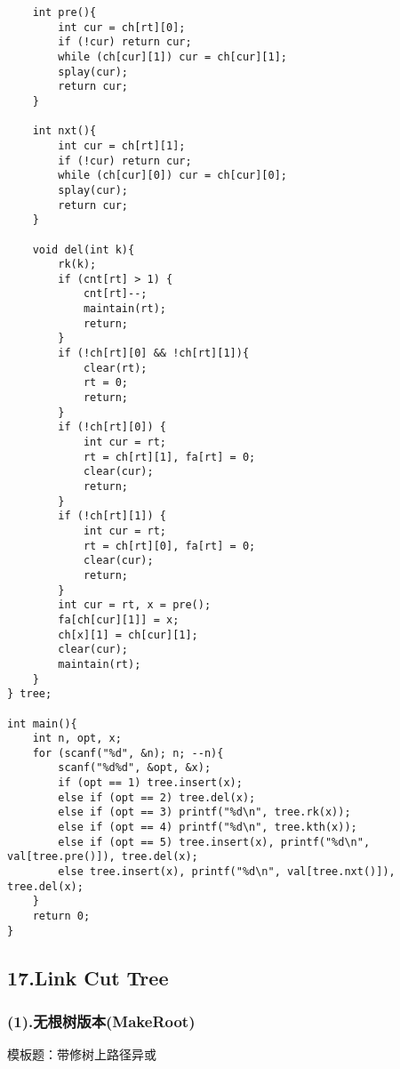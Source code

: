 \documentclass[]{article}
\begin{document}
\begin{verbatim}
    int pre(){
        int cur = ch[rt][0];
        if (!cur) return cur;
        while (ch[cur][1]) cur = ch[cur][1];
        splay(cur);
        return cur;
    }

    int nxt(){
        int cur = ch[rt][1];
        if (!cur) return cur;
        while (ch[cur][0]) cur = ch[cur][0];
        splay(cur);
        return cur;
    }

    void del(int k){
        rk(k);
        if (cnt[rt] > 1) {
            cnt[rt]--;
            maintain(rt);
            return;
        }
        if (!ch[rt][0] && !ch[rt][1]){
            clear(rt);
            rt = 0;
            return;
        }
        if (!ch[rt][0]) {
            int cur = rt;
            rt = ch[rt][1], fa[rt] = 0;
            clear(cur);
            return;
        }
        if (!ch[rt][1]) {
            int cur = rt;
            rt = ch[rt][0], fa[rt] = 0;
            clear(cur);
            return;
        }
        int cur = rt, x = pre();
        fa[ch[cur][1]] = x;
        ch[x][1] = ch[cur][1];
        clear(cur);
        maintain(rt);
    }
} tree;

int main(){
    int n, opt, x;
    for (scanf("%d", &n); n; --n){
        scanf("%d%d", &opt, &x);
        if (opt == 1) tree.insert(x);
        else if (opt == 2) tree.del(x);
        else if (opt == 3) printf("%d\n", tree.rk(x));
        else if (opt == 4) printf("%d\n", tree.kth(x));
        else if (opt == 5) tree.insert(x), printf("%d\n", val[tree.pre()]), tree.del(x);
        else tree.insert(x), printf("%d\n", val[tree.nxt()]), tree.del(x);
    }
    return 0;
}
\end{verbatim}

\hypertarget{link-cut-tree}{%
\subsection{17.Link Cut Tree}\label{link-cut-tree}}

\hypertarget{ux65e0ux6839ux6811ux7248ux672cmakeroot}{%
\subsubsection{(1).无根树版本(MakeRoot)}\label{ux65e0ux6839ux6811ux7248ux672cmakeroot}}

模板题：带修树上路径异或
\end{document}
